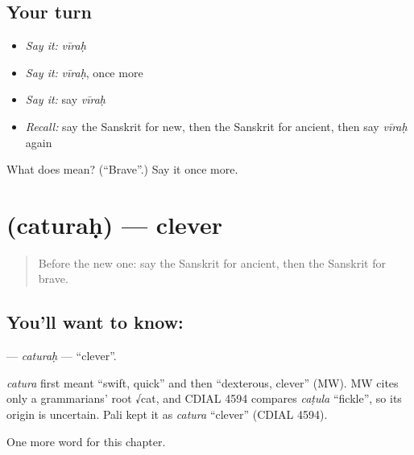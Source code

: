 \subsection*{Your turn}
\begin{itemize}
\raggedright
  \item \emph{Say it:} \emph{vīraḥ}
  \item \emph{Say it:} \emph{vīraḥ}, once more
  \item \emph{Say it:} say \emph{vīraḥ}
  \item \emph{Recall:} say the Sanskrit for new, then the Sanskrit for ancient, then say \emph{vīraḥ} again
\end{itemize}

\begin{tcolorbox}[breakable,colback=teal!4,colframe=teal!35!black,title={Before you move on}]
What does  mean? (\textquotedblleft{}Brave\textquotedblright{}.) Say it once more.
\end{tcolorbox}
\section[\texorpdfstring{\sk{चतुरः} (caturaḥ)}{चतुरः (caturaḥ)}]{ (caturaḥ) — clever}

\label{lesson:SA-C129-caturah}



\begin{quote}
Before the new one: say the Sanskrit for ancient, then the Sanskrit for brave.
\end{quote}

\subsection*{You'll want to know: }
\textbf{} — \emph{caturaḥ} — \textquotedblleft{}clever\textquotedblright{}.

\begin{cousinweb}
\emph{catura} first meant \textquotedblleft{}swift, quick\textquotedblright{} and then \textquotedblleft{}dexterous, clever\textquotedblright{} (MW). MW cites only a grammarians' root √cat, and CDIAL 4594 compares \emph{caṭula} \textquotedblleft{}fickle\textquotedblright{}, so its origin is uncertain. Pali kept it as \emph{catura} \textquotedblleft{}clever\textquotedblright{} (CDIAL 4594).
\end{cousinweb}

\begin{grammarlens}[title={What you've built}]
One more word for this chapter.
\end{grammarlens}

